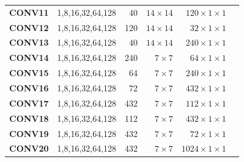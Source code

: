 \begin{table}[]
\begin{threeparttable}
\begin{tabular}{lrrrrr}
\textbf{CONV11} & 1,8,16,32,64,128  & 40    & $14\times 14$   & $120 \times 1\times 1$\\
\textbf{CONV12} & 1,8,16,32,64,128  & 120   & $14\times 14$   & $32 \times 1\times 1$\\
\textbf{CONV13} & 1,8,16,32,64,128  & 40    & $14\times 14$   & $240 \times 1\times 1$\\
\textbf{CONV14} & 1,8,16,32,64,128  & 240   & $7\times 7$     & $64  \times 1\times 1$\\
\textbf{CONV15} & 1,8,16,32,64,128  & 64    & $7\times 7$     & $240 \times 1\times 1$\\
\textbf{CONV16} & 1,8,16,32,64,128  & 72    & $7\times 7$     & $432 \times 1\times 1$\\
\textbf{CONV17} & 1,8,16,32,64,128  & 432   & $7\times 7$     & $112 \times 1\times 1$\\
\textbf{CONV18} & 1,8,16,32,64,128  & 112   & $7\times 7$     & $432 \times 1\times 1$\\
\textbf{CONV19} & 1,8,16,32,64,128  & 432   & $7\times 7$     & $72 \times 1\times 1$\\
\textbf{CONV20} & 1,8,16,32,64,128  & 432   & $7\times 7$     & $1024 \times 1\times 1$\\

\bottomrule
\end{tabular}
\end{threeparttable}
\end{table}

